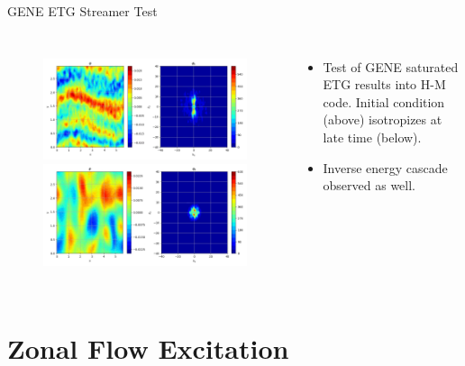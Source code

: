 \documentclass[aspectratio=43]{beamer}
\begin{document}
   \begin{frame}{GENE ETG Streamer Test}
      \begin{columns}
            \begin{figure}
               \includegraphics[height=.4\textheight,width=\textwidth]{Images/hmETG_geneInit.png}
               \\
               \includegraphics[height=.4\textheight,width=\textwidth]{Images/hmETG_geneIso.png}
            \end{figure}
            \begin{itemize}
               \item Test of GENE saturated ETG results into H-M code. Initial condition (above) isotropizes at late time (below).
               \item Inverse energy cascade observed as well.
            \end{itemize}
      \end{columns}
   \end{frame}

   \section{Zonal Flow Excitation}
\end{document}
